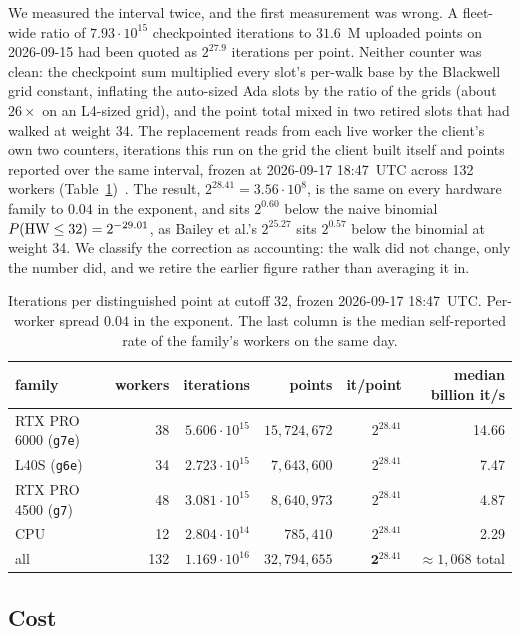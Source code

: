 We measured the interval twice, and the first measurement was
wrong. A fleet-wide ratio of $7.93\cdot10^{15}$ checkpointed
iterations to $31.6$~M uploaded points on 2026-09-15 had been quoted
as $2^{27.9}$ iterations per point. Neither counter was clean: the
checkpoint sum multiplied every slot's per-walk base by the Blackwell
grid constant, inflating the auto-sized Ada slots by the ratio of the
grids (about $26\times$ on an L4-sized grid), and the point total mixed in two retired slots that had walked at weight 34. The
replacement reads from each live worker the client's own two
counters, iterations this run on the grid the client built itself and
points reported over the same interval, frozen at 2026-09-17 18:47~UTC
across 132 workers (Table~\ref{tab:cutoff})~.
The result, $2^{28.41}=3.56\cdot10^8$, is the same on every hardware
family to $0.04$ in the exponent, and sits $2^{0.60}$ below the naive
binomial $P(\operatorname{HW}\le32)=2^{-29.01}$, as Bailey et al.'s $2^{25.27}$ sits
$2^{0.57}$ below the binomial at weight 34. We classify the
correction as accounting: the walk did not change, only the number
did, and we retire the earlier figure rather than averaging it in.

\begin{table}[t]
\centering
\small
\caption{Iterations per distinguished point at cutoff 32, frozen
  2026-09-17 18:47~UTC. Per-worker spread $0.04$ in the exponent. The
  last column is the median self-reported rate of the family's
  workers on the same day.}
\label{tab:cutoff}
\begin{tabular}{@{}lrrrrr@{}}
\toprule
family & workers & iterations & points & it/point & median billion it/s \\
\midrule
RTX PRO 6000 (\texttt{g7e}) & 38 & $5.606\cdot10^{15}$ & $15{,}724{,}672$ & $2^{28.41}$ & 14.66 \\
L40S (\texttt{g6e}) & 34 & $2.723\cdot10^{15}$ & $7{,}643{,}600$ & $2^{28.41}$ & 7.47 \\
RTX PRO 4500 (\texttt{g7}) & 48 & $3.081\cdot10^{15}$ & $8{,}640{,}973$ & $2^{28.41}$ & 4.87 \\
CPU & 12 & $2.804\cdot10^{14}$ & $785{,}410$ & $2^{28.41}$ & 2.29 \\
\midrule
all & 132 & $1.169\cdot10^{16}$ & $32{,}794{,}655$ & $\mathbf{2^{28.41}}$ & $\approx1{,}068$ total \\
\bottomrule
\end{tabular}
\end{table}

\subsection{Cost}
\label{sec:campaign-goal28}

